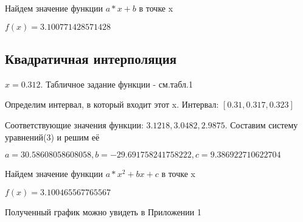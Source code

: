 \documentclass[12pt, a4paper]{article}
\begin{document}
Найдем значение функции $a*x+b$ в точке x

$f(x) =  3.100771428571428$

\subsection*{Квадратичная интерполяция}
$x = 0.312$. Табличное задание функции - см.табл.1

Определим интервал, в который входит этот x.
Интервал: $[0.31, 0.317, 0.323]$

Соответствующие значения функции: $3.1218, 3.0482, 2.9875$.
Составим систему уравнений(3) и решим её

$a = 30.58608058608058, b = -29.691758241758222, c = 9.386922710622704$

Найдем значение функции $a*x^2 + bx + c$ в точке x

$f(x) =  3.100465567765567$

Полученный график можно увидеть в Приложении 1
\end{document}
